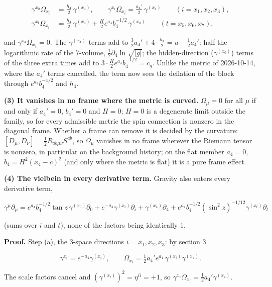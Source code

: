 \documentclass[11pt]{article}
\begin{document}
\[
\begin{aligned}
\gamma^{x_0}\Omega_{x_0} &= \tfrac{h_4}{2}\,\gamma^{(x_4)}, \qquad \gamma^{x_i}\Omega_{x_i} = \tfrac{a_4'}{2}\,\gamma^{(x_4)} \qquad (i = x_1, x_2, x_3), \\
\gamma^{x_t}\Omega_{x_t} &= \tfrac{h_4}{2}\,\gamma^{(x_4)} + \tfrac{H}{2}e^{a_4}b_4^{-1/2}\,\gamma^{(x_0)} \qquad (t = x_5, x_6, x_7),
\end{aligned}
\]

and $\gamma^{x_4}\Omega_{x_4} = 0$. The $\gamma^{(x_4)}$ terms add to $\tfrac32a_4' + 4\cdot\tfrac{h_4}{2} = u - \tfrac12a_4'$: half the logarithmic rate of the 7-volume, $\tfrac12\partial_4\ln\sqrt{|g|}$; the hidden-direction ($\gamma^{(x_0)}$) terms of the three extra times add to $3 \cdot \tfrac{H}{2}e^{a_4}b_4^{-1/2} = c_g$. Unlike the metric of 2026-10-14, where the $a_4'$ terms cancelled, the term now sees the deflation of the block through $e^{a_4}b_4^{-1/2}$ and $h_4$.

\textbf{(3) It vanishes in no frame where the metric is curved.} $\Omega_\mu = 0$ for all $\mu$ if and only if $a_4' = 0$, $b_4' = 0$ and $H = 0$; $H = 0$ is a degenerate limit outside the family, so for every admissible metric the spin connection is nonzero in the diagonal frame. Whether a frame can remove it is decided by the curvature: $[D_\mu, D_\nu] = \tfrac12 R_{ab\mu\nu}S^{ab}$, so $\Omega_\mu$ vanishes in no frame wherever the Riemann tensor is nonzero, in particular on the background history; on the flat member $a_4 = 0$, $b_4 = H^2(x_4 - c)^2$ (and only where the metric is flat) it is a pure frame effect.

\textbf{(4) The vielbein in every derivative term.} Gravity also enters every derivative term,

\[
\gamma^\mu\partial_\mu = e^{a_4}b_4^{-1/2}\tan z\,\gamma^{(x_0)}\partial_0 + e^{-a_4}\gamma^{(x_i)}\partial_i + \gamma^{(x_4)}\partial_4 + e^{a_4}b_4^{-1/2}(\sin^2 z)^{-1/12}\gamma^{(x_t)}\partial_t
\]

(sums over $i$ and $t$), none of the factors being identically 1.

\textbf{Proof.} Step (a), the 3-space directions $i = x_1, x_2, x_3$: by section 3

\[
\gamma^{x_i} = e^{-a_4}\gamma^{(x_i)}, \qquad \Omega_{x_i} = \tfrac12 a_4'e^{a_4}\,\gamma^{(x_i)}\gamma^{(x_4)} .
\]

The scale factors cancel and $(\gamma^{(x_i)})^2 = \eta^{ii} = +1$, so $\gamma^{x_i}\Omega_{x_i} = \tfrac12a_4'\gamma^{(x_4)}$.
\end{document}
